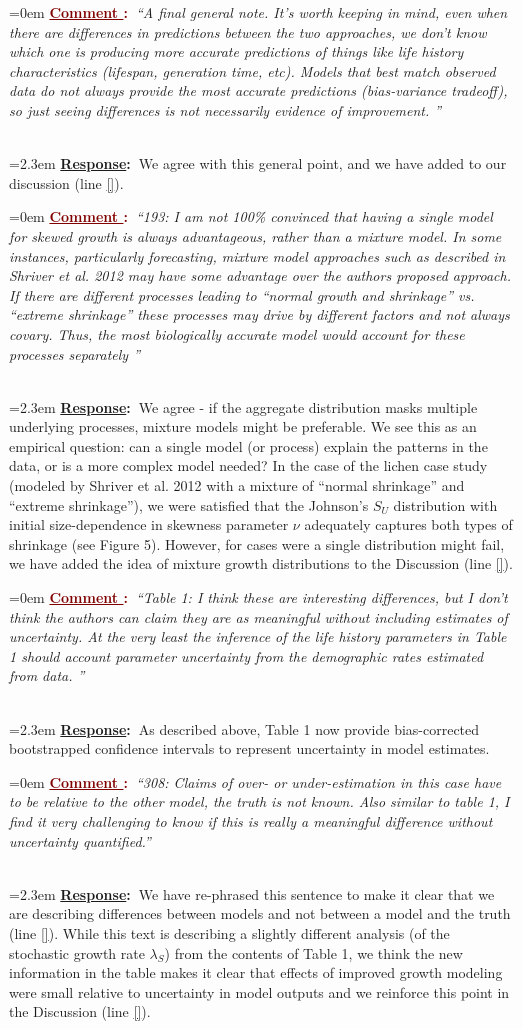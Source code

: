 \documentclass[12pt]{article}
\newcounter{cN}
\newcommand{\comment}[1]{
	\vspace{2em}
	\refstepcounter{cN} %
	\noindent \hangindent=0em \textbf{\textcolor{Maroon}{\uline{Comment \thecN}:~}}\emph{``#1''}
	}
\newcommand{\response}[1]{
	\\[0.25em]
	\hangindent=2.3em \textbf{\textcolor{NavyBlue}{\uline{Response}:~}}#1
	}
\begin{document}
\comment{A final general note.  It’s worth keeping in mind, even when there are differences in predictions between the two approaches, we don’t know which one is producing more accurate predictions of things like life history characteristics (lifespan, generation time, etc). Models that best match observed data do not always provide the most accurate predictions (bias-variance tradeoff), so just seeing differences is not necessarily evidence of improvement.  }
\response{We agree with this general point, and we have added to our discussion (line \ref{}). }

\comment{193: I am not 100\% convinced that having a single model for skewed growth is always advantageous, rather than a mixture model. In some instances, particularly forecasting, mixture model approaches such as described in Shriver et al. 2012 may have some advantage over the authors proposed approach. If there are different processes leading to “normal growth and shrinkage” vs. “extreme shrinkage” these processes may drive by different factors and not always covary. Thus, the most biologically accurate model would account for these processes separately }
\response{We agree - if the aggregate distribution masks multiple underlying processes, mixture models might be preferable. We see this as an empirical question: can a single model (or process) explain the patterns in the data, or is a more complex model needed? In the case of the lichen case study (modeled by Shriver et al. 2012 with a mixture of ``normal shrinkage'' and ``extreme shrinkage''), we were satisfied that the Johnson's $S_{U}$ distribution with initial size-dependence in skewness parameter $\nu$ adequately captures both types of shrinkage (see Figure 5). However, for cases were a single distribution might fail, we have added the idea of mixture growth distributions to the Discussion (line \ref{}).}

\comment{Table 1: I think these are interesting differences, but I don’t think the authors can claim they are as meaningful without including estimates of uncertainty. At the very least the inference of the life history parameters in Table 1 should account parameter uncertainty from the demographic rates estimated from data. }
\response{As described above, Table 1 now provide bias-corrected bootstrapped confidence intervals to represent uncertainty in model estimates.}

\comment{308: Claims of over- or under-estimation in this case have to be relative to the other model, the truth is not known. Also similar to table 1, I find it very challenging to know if this is really a meaningful difference without uncertainty quantified.}
\response{We have re-phrased this sentence to make it clear that we are describing differences between models and not between a model and the truth (line \ref{}). While this text is describing a slightly different analysis (of the stochastic growth rate $\lambda_S$) from the contents of Table 1, we think the new information in the table makes it clear that effects of improved growth modeling were small relative to uncertainty in model outputs and we reinforce this point in the Discussion (line \ref{}).} 
\end{document}
